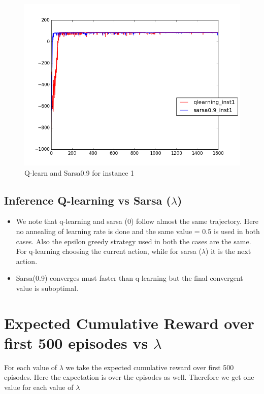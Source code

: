 \documentclass{article}
\begin{document}
\begin{figure}[H]
  \centering
  \includegraphics[scale=0.5]{images/qlearn_sarsa0_9_instance_1}
  \caption{Q-learn and Sarsa0.9 for instance 1}
  \label{fig:ins1}
\end{figure}

\subsection{Inference Q-learning vs Sarsa ($\lambda$)}
\begin{itemize}
\item We note that q-learning and sarsa (0) follow almost the same trajectory. Here no annealing of learning rate is done and the same value = 0.5 is used in both cases. Also the epsilon greedy strategy used in both the cases are the same. For q-learning choosing the current action, while for sarsa ($\lambda$) it is the next action.
\item Sarsa(0.9) converges must faster than q-learning but the final convergent value is suboptimal.
\end{itemize}
\section{Expected Cumulative Reward over first 500 episodes vs $\lambda$}
For each value of $\lambda$ we take the expected cumulative reward over first 500 episodes. Here the expectation is over the episodes as well. Therefore we get one value for each value of $\lambda$
\end{document}
